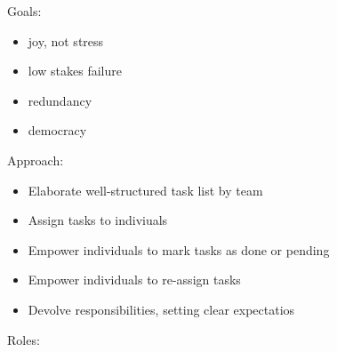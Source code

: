 \documentclass[
  letterpaper,
  DIV=11,
  numbers=noendperiod,
  oneside]{scrreprt}
\begin{document}
\hfill\break
\hfill\break

Goals:

\begin{itemize}
\item
  joy, not stress
\item
  low stakes failure
\item
  redundancy
\item
  democracy
\end{itemize}

Approach:

\begin{itemize}
\item
  Elaborate well-structured task list by team
\item
  Assign tasks to indiviuals
\item
  Empower individuals to mark tasks as done or pending
\item
  Empower individuals to re-assign tasks
\item
  Devolve responsibilities, setting clear expectatios
\end{itemize}

Roles:
\end{document}
